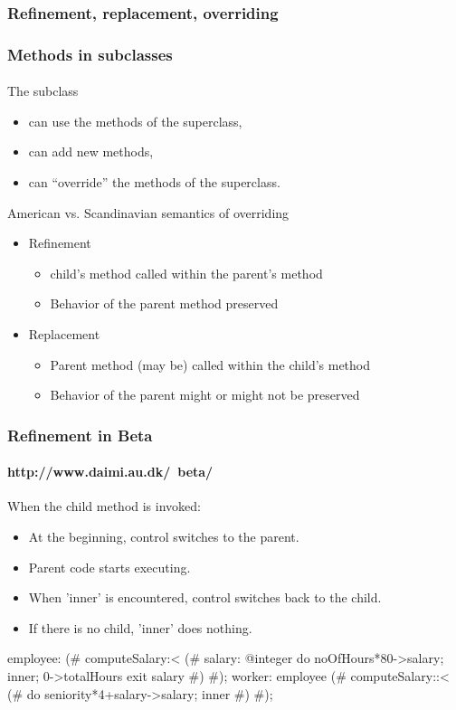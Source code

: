 \documentclass{beamer}
\begin{document}
\subsubsection{Refinement, replacement, overriding}
\begin{frame}[fragile]
\frametitle{Methods in subclasses}
\framesubtitle{}
The subclass
\begin{itemize}
\item can use  the methods of the superclass,
\item can add new methods,
\item can ``override'' the methods of the superclass.
\end{itemize}
\bigskip

American vs. Scandinavian semantics of overriding
\begin{itemize}
\item Refinement
\begin{itemize}
\item child's method called within the parent's method
\item Behavior of the parent method preserved
\end{itemize}
\item Replacement
\begin{itemize}
\item Parent method (may be) called within the child's method
\item Behavior of the parent might or might not be preserved 
\end{itemize}
\end{itemize}
\end{frame}






\begin{frame}[fragile]
\frametitle{Refinement in Beta}
\framesubtitle{http://www.daimi.au.dk/~beta/}
When the child method is invoked:
\begin{itemize}
\item At the beginning, control switches to the parent.
\item Parent code starts executing.
\item When 'inner' is encountered, control switches
back to the child. 
\item If there is no child, 'inner' does nothing. 
\end{itemize}
\begin{java}
employee:
(# computeSalary:< 
     (# salary: @integer 
     do noOfHours*80->salary; inner; 0->totalHours  
     exit salary
     #)
#);
worker: employee
    (# computeSalary::< 
       (# do seniority*4+salary->salary; inner #)
 #);

\end{java}

\end{frame}
\end{document}
